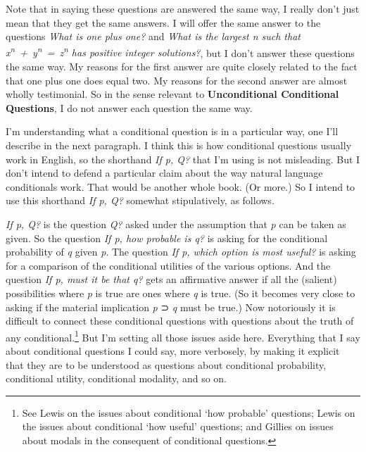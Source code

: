 \documentclass[
  11pt,
]{book}
\begin{document}
Note that in saying these questions are answered the same way, I really don't just mean that they get the same answers. I will offer the same answer to the questions \emph{What is one plus one?} and \emph{What is the largest n such that x\textsuperscript{n}~+~y\textsuperscript{n}~=~z\textsuperscript{n} has positive integer solutions?}, but I don't answer these questions the same way. My reasons for the first answer are quite closely related to the fact that one plus one does equal two. My reasons for the second answer are almost wholly testimonial. So in the sense relevant to \textbf{Unconditional Conditional Questions}, I do not answer each question the same way.

I'm understanding what a conditional question is in a particular way, one I'll describe in the next paragraph. I think this is how conditional questions usually work in English, so the shorthand \emph{If p, Q?} that I'm using is not misleading. But I don't intend to defend a particular claim about the way natural language conditionals work. That would be another whole book. (Or more.) So I intend to use this shorthand \emph{If p, Q?} somewhat stipulatively, as follows.

\emph{If p, Q?} is the question \emph{Q?} asked under the assumption that \emph{p} can be taken as given. So the question \emph{If p, how probable is q?} is asking for the conditional probability of \emph{q} given \emph{p}. The question \emph{If p, which option is most useful?} is asking for a comparison of the conditional utilities of the various options. And the question \emph{If p, must it be that q?} gets an affirmative answer if all the (salient) possibilities where \emph{p} is true are ones where \emph{q} is true. (So it becomes very close to asking if the material implication \emph{p} ⊃ \emph{q} must be true.) Now notoriously it is difficult to connect these conditional questions with questions about the truth of any conditional.\footnote{See Lewis \citetext{\citeyear{Lewis1976b}; \citeyear{Lewis1986h}} on the issues about conditional `how probable' questions; Lewis \citetext{\citeyear{Lewis1988}; \citeyear{Lewis1996}} on the issues about conditional `how useful' questions; and Gillies \citeyearpar{Gillies2010} on issues about modals in the consequent of conditional questions.} But I'm setting all those issues aside here. Everything that I say about conditional questions I could say, more verbosely, by making it explicit that they are to be understood as questions about conditional probability, conditional utility, conditional modality, and so on.
\end{document}
